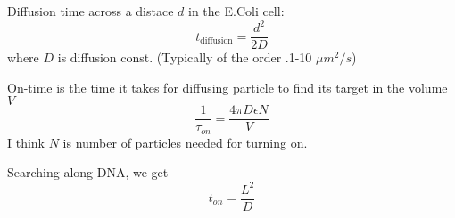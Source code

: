 \documentclass{article}
\begin{document}
Diffusion time across a distace $d$ in the E.Coli cell: 
\begin{equation}
	t_{\text{diffusion}} = \frac{d^2}{2D}
\end{equation}
where $D$ is diffusion const. (Typically of the order .1-10 $\mu m^2/s$)

On-time is the time it takes for diffusing particle to find its target in the volume $V$
\begin{equation}
	\frac{1}{\tau_{on}} = \frac{4\pi D\epsilon N}{V}
\end{equation}
I think $N$ is number of particles needed for turning on. 

Searching along DNA, we get 
\begin{equation}
	t_{on} = \frac{L^2}{D}
\end{equation}
\end{document}
